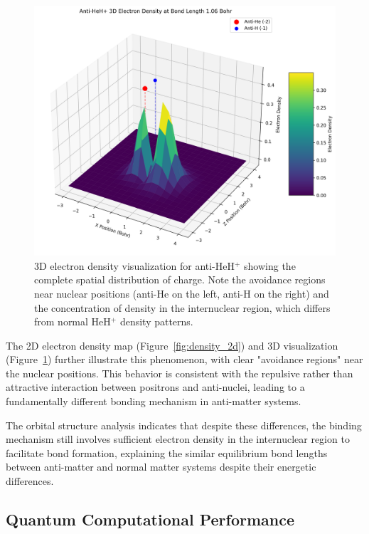 \documentclass[10pt,twocolumn,a4paper]{article}
\begin{document}
\begin{figure}[t!]
    \centering
    \includegraphics[width=\columnwidth]{graphs/anti_heh_density_3d.png}
    \caption{3D electron density visualization for anti-HeH$^+$ showing the complete spatial distribution of charge. Note the avoidance regions near nuclear positions (anti-He on the left, anti-H on the right) and the concentration of density in the internuclear region, which differs from normal HeH$^+$ density patterns.}
    \label{fig:density_3d}
\end{figure}

The 2D electron density map (Figure~\ref{fig:density_2d}) and 3D visualization (Figure~\ref{fig:density_3d}) further illustrate this phenomenon, with clear "avoidance regions" near the nuclear positions. This behavior is consistent with the repulsive rather than attractive interaction between positrons and anti-nuclei, leading to a fundamentally different bonding mechanism in anti-matter systems.

The orbital structure analysis indicates that despite these differences, the binding mechanism still involves sufficient electron density in the internuclear region to facilitate bond formation, explaining the similar equilibrium bond lengths between anti-matter and normal matter systems despite their energetic differences.

\subsection{Quantum Computational Performance}
\end{document}
